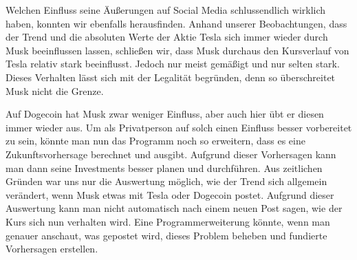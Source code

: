 \documentclass{article}
\begin{document}
Welchen Einfluss seine Äußerungen auf Social Media schlussendlich wirklich haben, konnten wir ebenfalls herausfinden. Anhand unserer Beobachtungen, dass der Trend und die absoluten Werte der Aktie Tesla sich immer wieder durch Musk beeinflussen lassen, schließen wir, dass Musk durchaus den Kursverlauf von Tesla relativ stark beeinflusst. Jedoch nur meist gemäßigt und nur selten stark. Dieses Verhalten lässt sich mit der Legalität begründen, denn so überschreitet Musk nicht die Grenze.

Auf Dogecoin hat Musk zwar weniger Einfluss, aber auch hier übt er diesen immer wieder aus. Um als Privatperson auf solch einen Einfluss besser vorbereitet zu sein, könnte man nun das Programm noch so erweitern, dass es eine Zukunftsvorhersage berechnet und ausgibt. Aufgrund dieser Vorhersagen kann man dann seine Investments besser planen und durchführen. Aus zeitlichen Gründen war uns nur die Auswertung möglich, wie der Trend sich allgemein verändert, wenn Musk etwas mit Tesla oder Dogecoin postet. Aufgrund dieser Auswertung kann man nicht automatisch nach einem neuen Post sagen, wie der Kurs sich nun verhalten wird. Eine Programmerweiterung könnte, wenn man genauer anschaut, was gepostet wird, dieses Problem beheben und fundierte Vorhersagen erstellen.
\end{document}
